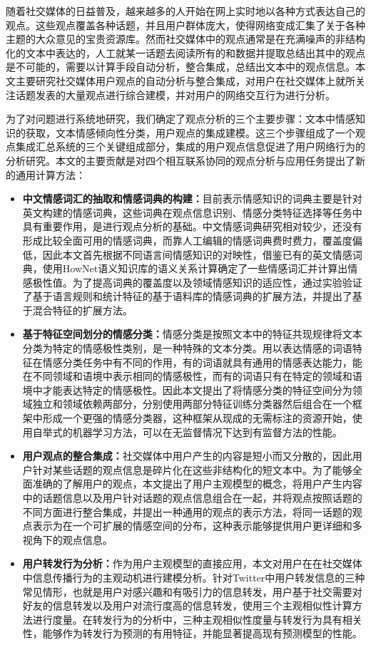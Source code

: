 \begin{cabstract}
随着社交媒体的日益普及，越来越多的人开始在网上实时地以各种方式表达自己的观点。这些观点覆盖各种话题，并且用户群体庞大，使得网络变成汇集了关于各种主题的大众意见的宝贵资源库。然而社交媒体中的观点通常是在充满噪声的非结构化的文本中表达的，人工就某一话题去阅读所有的和数据并提取总结出其中的观点是不可能的，需要以计算手段自动分析，整合集成，总结出文本中的观点信息。本文主要研究社交媒体用户观点的自动分析与整合集成，对用户在社交媒体上就所关注话题发表的大量观点进行综合建模，并对用户的网络交互行为进行分析。

为了对问题进行系统地研究，我们确定了观点分析的三个主要步骤：文本中情感知识的获取，文本情感倾向性分类，用户观点的集成建模。这三个步骤组成了一个观点集成汇总系统的三个关键组成部分，集成的用户观点信息促进了用户网络行为的分析研究。本文的主要贡献是对四个相互联系协同的观点分析与应用任务提出了新的通用计算方法：
\begin{itemize}
\item \textbf{中文情感词汇的抽取和情感词典的构建：}目前表示情感知识的词典主要是针对英文构建的情感词典，这些词典在观点信息识别、情感分类特征选择等任务中具有重要作用，是进行观点分析的基础。中文情感词典研究相对较少，还没有形成比较全面可用的情感词典，而靠人工编辑的情感词典费时费力，覆盖度偏低，因此本文首先根据不同语言间情感知识的对映性，借鉴已有的英文情感词典，使用HowNet语义知识库的语义关系计算确定了一些情感词汇并计算出情感极性值。为了提高词典的覆盖度以及领域情感知识的适应性，通过实验验证了基于语言规则和统计特征的基于语料库的情感词典的扩展方法，并提出了基于混合特征的扩展方法。
\item \textbf{基于特征空间划分的情感分类：}情感分类是按照文本中的特征共现规律将文本分类为特定的情感极性类别，是一种特殊的文本分类。用以表达情感的词语特征在情感分类任务中有不同的作用，有的词语就具有通用的情感表达能力，能在不同领域和语境中表示相同的情感极性，而有的词语只有在特定的领域和语境中才能表达特定的情感极性。因此本文提出了将情感分类的特征空间分为领域独立和领域依赖两部分，分别使用两部分特征训练分类器然后组合在一个框架中形成一个更强的情感分类器，这种框架从现成的无需标注的资源开始，使用自举式的机器学习方法，可以在无监督情况下达到有监督方法的性能。
\item \textbf{用户观点的整合集成：}社交媒体中用户产生的内容是短小而又分散的，因此用户针对某些话题的观点信息是碎片化在这些非结构化的短文本中。为了能够全面准确的了解用户的观点，本文提出了用户主观模型的概念，将用户产生内容中的话题信息以及用户针对话题的观点信息组合在一起，并将观点按照话题的不同方面进行整合集成，并提出一种通用的观点的表示方法，将同一话题的观点表示为在一个可扩展的情感空间的分布，这种表示能够提供用户更详细和多视角下的观点信息。
\item \textbf{用户转发行为分析：}作为用户主观模型的直接应用，本文对用户在在社交媒体中信息传播行为的主观动机进行建模分析。针对Twitter中用户转发信息的三种常见情形，也就是用户对感兴趣和有吸引力的信息转发，用户基于社交需要对好友的信息转发以及用户对流行度高的信息转发，使用三个主观相似性计算方法进行度量。在转发行为的分析中，三种主观相似性度量与转发行为具有相关性，能够作为转发行为预测的有用特征，并能显著提高现有预测模型的性能。
\end{itemize}


\end{cabstract}
